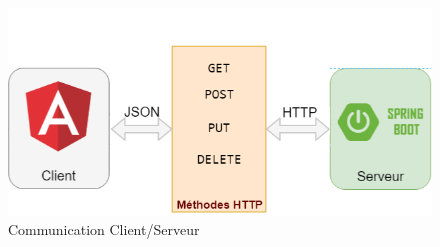 \begin{figure}[h!]  
 \centering
    \includegraphics[width=1\textwidth]{chapitre3/Figures/rest.png}
  \caption{Communication Client/Serveur}
\end{figure}

